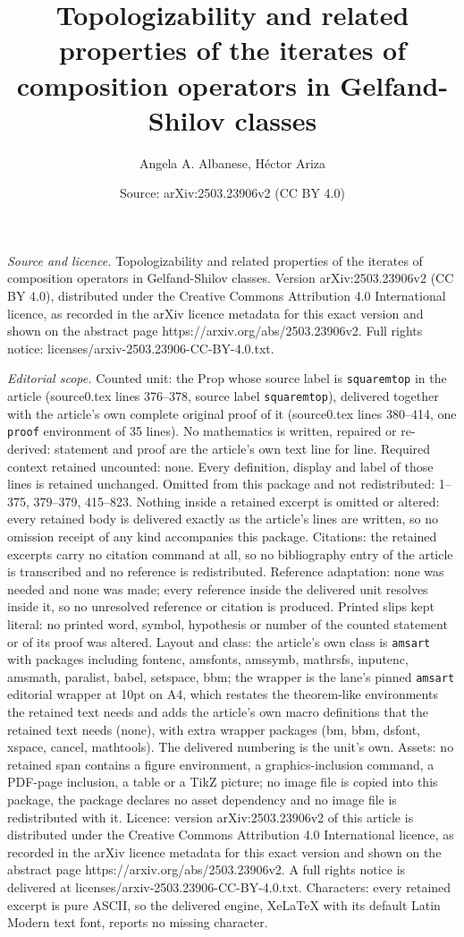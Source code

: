 \documentclass[10pt,a4paper]{amsart}
\title[Topologizability and related properties of the iterates of c]{Topologizability and related properties of the iterates of composition operators in Gelfand-Shilov classes}
\author{Angela A. Albanese, H\'ector Ariza}
\date{Source: arXiv:2503.23906v2 (CC BY 4.0)}
\begin{document}
\maketitle

\noindent\emph{Source and licence.} Topologizability and related properties of the iterates of composition operators in Gelfand-Shilov classes. Version arXiv:2503.23906v2 (CC BY 4.0), distributed under the Creative Commons Attribution 4.0 International licence, as recorded in the arXiv licence metadata for this exact version and shown on the abstract page https://arxiv.org/abs/2503.23906v2. Full rights notice: licenses/arxiv-2503.23906-CC-BY-4.0.txt.\par\smallskip

\noindent\textit{Editorial scope.} Counted unit: the Prop whose source label is \texttt{squaremtop} in the article (source0.tex lines 376--378, source label \texttt{squaremtop}), delivered together with the article's own complete original proof of it (source0.tex lines 380--414, one \texttt{proof} environment of 35 lines). No mathematics is written, repaired or re-derived: statement and proof are the article's own text line for line. Required context retained uncounted: none. Every definition, display and label of those lines is retained unchanged. Omitted from this package and not redistributed: 1--375, 379--379, 415--823. Nothing inside a retained excerpt is omitted or altered: every retained body is delivered exactly as the article's lines are written, so no omission receipt of any kind accompanies this package. Citations: the retained excerpts carry no citation command at all, so no bibliography entry of the article is transcribed and no reference is redistributed. Reference adaptation: none was needed and none was made; every reference inside the delivered unit resolves inside it, so no unresolved reference or citation is produced. Printed slips kept literal: no printed word, symbol, hypothesis or number of the counted statement or of its proof was altered. Layout and class: the article's own class is \texttt{amsart} with packages including fontenc, amsfonts, amssymb, mathrsfs, inputenc, amsmath, paralist, babel, setspace, bbm; the wrapper is the lane's pinned \texttt{amsart} editorial wrapper at 10pt on A4, which restates the theorem-like environments the retained text needs and adds the article's own macro definitions that the retained text needs (none), with extra wrapper packages (bm, bbm, dsfont, xspace, cancel, mathtools). The delivered numbering is the unit's own. Assets: no retained span contains a figure environment, a graphics-inclusion command, a PDF-page inclusion, a table or a TikZ picture; no image file is copied into this package, the package declares no asset dependency and no image file is redistributed with it. Licence: version arXiv:2503.23906v2 of this article is distributed under the Creative Commons Attribution 4.0 International licence, as recorded in the arXiv licence metadata for this exact version and shown on the abstract page https://arxiv.org/abs/2503.23906v2. A full rights notice is delivered at licenses/arxiv-2503.23906-CC-BY-4.0.txt. Characters: every retained excerpt is pure ASCII, so the delivered engine, XeLaTeX with its default Latin Modern text font, reports no missing character.
\end{document}
